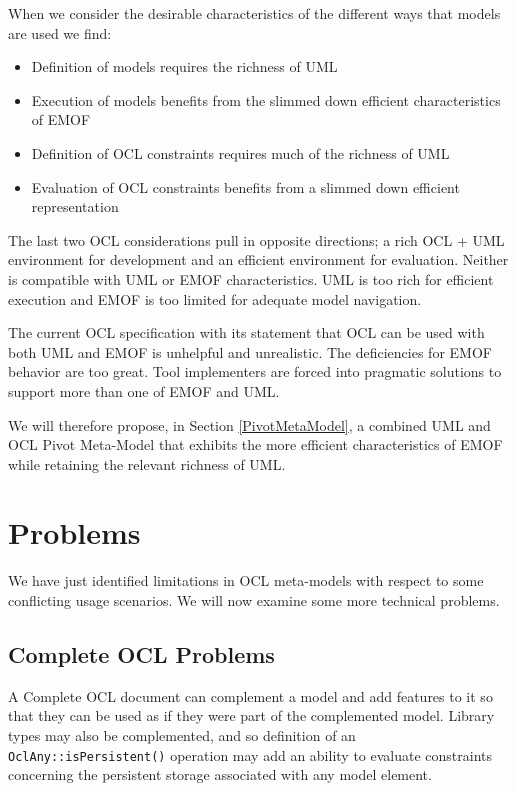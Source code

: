\documentclass{eceasst}
\begin{document}
When we consider the desirable characteristics of the different ways that models are used we find:
\begin{itemize}
\item Definition of models requires the richness of UML
\item Execution of models benefits from the slimmed down efficient characteristics of EMOF 
\item Definition of OCL constraints requires much of the richness of UML
\item Evaluation of OCL constraints benefits from a slimmed down efficient representation
\end{itemize}

The last two OCL considerations pull in opposite directions; a rich OCL + UML environment for development and an efficient environment for evaluation. Neither is compatible with UML or EMOF characteristics. UML is too rich for efficient execution and EMOF is too limited for adequate model navigation.

The current OCL specification with its statement that OCL can be used with both UML and EMOF is unhelpful and unrealistic. The deficiencies for EMOF behavior are too great. Tool implementers are forced into pragmatic solutions to support more than one of EMOF and UML. 

We will therefore propose, in Section \ref{PivotMetaModel},  a combined UML and OCL Pivot Meta-Model that exhibits the more efficient characteristics of EMOF while retaining the relevant richness of UML.

\section{Problems}\label{Problems}

We have just identified limitations in OCL meta-models with respect to some conflicting usage scenarios. We will now examine some more technical problems.

\subsection{Complete OCL Problems}\label{CompleteOCL}

A Complete OCL document can complement a model and add features to it so that they can be used as if they were part of the complemented model. Library types may also be complemented, and so definition of an \verb|OclAny::isPersistent()| operation may add an ability to evaluate constraints concerning the persistent storage associated with any model element.
\end{document}
